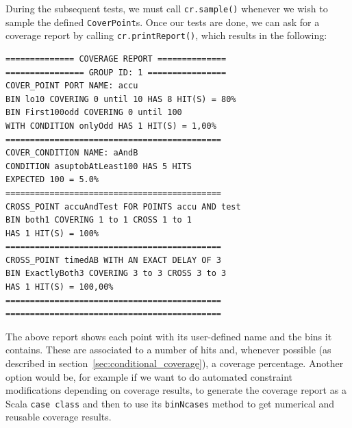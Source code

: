 \documentclass[a4paper]{IEEEtran}
\begin{document}
During the subsequent tests, we must call \texttt{cr.sample()} whenever we wish to sample the defined \texttt{CoverPoint}s. %
Once our tests are done, we can ask for a coverage report by calling \texttt{cr.printReport()}, which results in the following: 
\begin{verbatim}
============== COVERAGE REPORT ==============
================ GROUP ID: 1 ================
COVER_POINT PORT NAME: accu
BIN lo10 COVERING 0 until 10 HAS 8 HIT(S) = 80%
BIN First100odd COVERING 0 until 100 
WITH CONDITION onlyOdd HAS 1 HIT(S) = 1,00%
============================================
COVER_CONDITION NAME: aAndB
CONDITION asuptobAtLeast100 HAS 5 HITS 
EXPECTED 100 = 5.0%
============================================
CROSS_POINT accuAndTest FOR POINTS accu AND test
BIN both1 COVERING 1 to 1 CROSS 1 to 1 
HAS 1 HIT(S) = 100%
============================================
CROSS_POINT timedAB WITH AN EXACT DELAY OF 3
BIN ExactlyBoth3 COVERING 3 to 3 CROSS 3 to 3 
HAS 1 HIT(S) = 100,00%
============================================
============================================
\end{verbatim}
The above report shows each point with its user-defined name and the bins it contains. These are associated to a number of hits and, whenever possible (as described in section~\ref{sec:conditional_coverage}), a coverage percentage.
Another option would be, for example if we want to do automated constraint modifications depending on coverage results, to generate the coverage report as a Scala \texttt{case class} and then to use its \texttt{binNcases} method to get numerical and reusable coverage results.  
\end{document}
